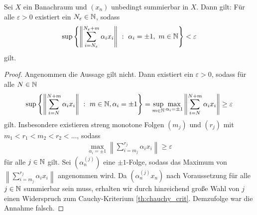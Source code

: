 \begin{lem}\label{th:unconditional_uniform}
	Sei $ X $ ein Banachraum und $ (x_n) $ unbedingt summierbar in $ X $.
	Dann gilt:
	Für alle $ \varepsilon > 0 $ existiert ein $ N_\varepsilon \in \mathbb{N} $, sodass
	\begin{align}
		\sup
		\left\{
		\left\|
		\sum \limits_{i=N_\varepsilon}^{N_\varepsilon+ m } \alpha_i x_i \right\| \ : \
		\alpha_i = \pm 1, \ m \in \mathbb{N}	
		\right\}
		< \varepsilon 
	\end{align}
gilt.
\end{lem}

\begin{proof}
	Angenommen die Aussage gilt nicht.
	Dann existiert ein $ \varepsilon > 0 $, sodass für alle $ N \in \mathbb{N} $
	\begin{align*}
		\sup\left\{
		\left\| \sum \limits_{i = N}^{N+m} \alpha_i x_i \right\| \ : \ m \in \mathbb{N} , \alpha_i = \pm 1
		\right\}
		=
		\sup \limits_{m \in \mathbb{N}}
		\max \limits_{\alpha_i = \pm 1}
		\left\| \sum \limits_{i = N}^{N+m} \alpha_i x_i \right\|
		\geq \varepsilon
	\end{align*}
	gilt.
	Insbesondere existieren streng monotone Folgen
	$ (m_j) $ und $ (r_j) $ mit \\
	$ m_1 < r_1 < m_2 < r_2 <... $, sodass
	\begin{align*}
		\max \limits_{\alpha_i = \pm 1}
		\left\| \sum \limits_{i = m_j}^{r_j} \alpha_i x_i \right\|
		\geq \varepsilon
	\end{align*}
	für alle $ j \in \mathbb{N} $ gilt. 
	Sei $ (\alpha^{(j)}_n) $ eine $ \pm 1 $-Folge, sodass das Maximum von $ \left\| \sum_{i = m_j}^{r_j} \alpha_i x_i \right\| $ angenommen wird.
	Da $ (\alpha_n^{(j)} x_n) $ nach Voraussetzung für alle $ j \in \mathbb{N} $ summierbar sein muss, erhalten wir durch hinreichend große Wahl von $ j $
	einen Widerspruch zum Cauchy-Kriterium \ref{th:chauchy_crit}.
	Demzufolge war die Annahme falsch.
%	
%	
%	
%	
\end{proof}



